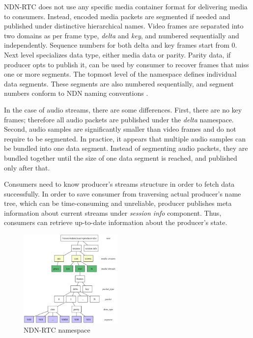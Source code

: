\documentclass{icn/sig-alternate-2012} %
\newcommand{\ndnrtcName}{NDN-RTC} %
\begin{document}

\ndnrtcName{} does not use any specific media container format for delivering media to consumers. Instead, encoded media packets are segmented if needed and published under distinctive hierarchical names. Video frames are separated into two domains as per frame type, \textit{delta} and \textit{key}, and numbered sequentially and independently. Sequence numbers for both delta and key frames start from 0. Next level specializes data type, either media data or parity. Parity data, if producer opts to publish it, can be used by consumer to recover frames that miss one or more segments. The topmost level of the namespace defines individual data segments. These segments are also numbered sequentially, and segment numbers conform to NDN naming conventions \cite{ndn_naming}.

In the case of audio streams, there are some differences. First, there are no key frames; therefore all audio packets are published under the \textit{delta} namespace. Second, audio samples are significantly smaller than video frames and do not require to be segmented. In practice, it appears that multiple audio samples can be bundled into one data segment. Instead of segmenting audio packets, they are bundled together until the size of one data segment is reached, and published only after that.

Consumers need to know producer's streams structure in order to fetch data successfully. In order to save consumer from traversing actual producer's name tree, which can be time-consuming and unreliable, producer publishes meta information about current streams under \textit{session info} component. Thus, consumers can retrieve up-to-date information about the producer's state.

\begin{figure}[t!]
\centering
\includegraphics[width=0.45\textwidth]{namespace}
\caption{\ndnrtcName{} namespace}
\label{fig:namespace}
\end{figure}
\end{document}
